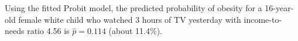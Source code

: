 ﻿\noindent Using the fitted Probit model, the predicted probability of obesity for a 16-year-old female white child who watched 3 hours of TV yesterday with income-to-needs ratio 4.56 is \(\hat{p}=0.114\) (about 11.4\%).
